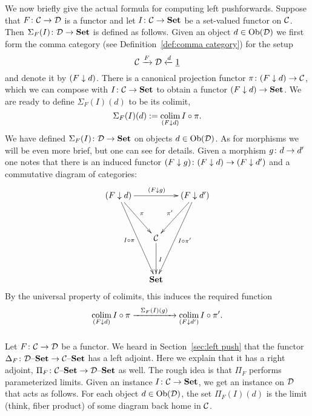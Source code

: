 \documentclass[CT4S-EN-RU]{subfiles}
\begin{document}
\begin{exerciseRUS}
\end{exerciseRUS}

\begin{blockENG}
We now briefly give the actual formula for computing left pushforwards. Suppose that $F\colon\mathcal{C}\rightarrow\mathcal{D}$ is a functor and let $I\colon\mathcal{C}\rightarrow{\mathbf{Set}}$ be a set-valued functor on $\mathcal{C}$. Then $\Sigma_F(I)\colon\mathcal{D}\rightarrow{\mathbf{Set}}$ is defined as follows. Given an object $d\in\textnormal{Ob}(\mathcal{D})$ we first form the comma category (see Definition~\ref{def:comma category}) for the setup
$$\mathcal{C}\xrightarrow{F}\mathcal{D}\xleftarrow{d}\underline{1}$$
and denote it by $(F\downarrow d)$. There is a canonical projection functor $\pi\colon(F\downarrow d)\rightarrow\mathcal{C}$, which we can compose with $I\colon\mathcal{C}\rightarrow{\mathbf{Set}}$ to obtain a functor $(F\downarrow d)\rightarrow{\mathbf{Set}}$. We are ready to define $\Sigma_F(I)(d)$ to be its colimit,
$$\Sigma_F(I)(d):=\mathop{\textnormal{colim}}_{(F\downarrow d)}I\circ\pi.$$
We have defined $\Sigma_F(I)\colon\mathcal{D}\rightarrow{\mathbf{Set}}$ on objects $d\in\textnormal{Ob}(\mathcal{D})$. As for morphisms we will be even more brief, but one can see \cite{Sp1} for details. Given a morphism $g\colon d\rightarrow d'$ one notes that there is an induced functor $(F\downarrow g)\colon (F\downarrow d)\rightarrow(F\downarrow d')$ and a commutative diagram of categories:
$$
\xymatrix@=15pt{
(F\down d)\ar[rr]^{(F\down g)}\ar[ddr]^{\pi}\ar[ddddr]_{I\circ\pi}&&(F\down d')\ar[ddl]_{\pi'}\ar[ddddl]^{I\circ\pi'}\\\\
&\mcC\ar[dd]^I\\\\
&\Set
}
$$
By the universal property of colimits, this induces the required function $$\mathop{\textnormal{colim}}_{(F\downarrow d)}I\circ\pi\xrightarrow{\ \ \Sigma_F(I)(g)\ \ }\mathop{\textnormal{colim}}_{(F\downarrow d')}I\circ\pi'.$$
\end{blockENG}

\begin{blockRUS}
\end{blockRUS}


\subsubsection{}

\begin{blockENG}
Let $F\colon\mathcal{C}\rightarrow\mathcal{D}$ be a functor. We heard in Section~\ref{sec:left push} that the functor $\Delta_F\colon\mathcal{D}{\text \textendash}{\mathbf{Set}}\rightarrow\mathcal{C}{\text \textendash}{\mathbf{Set}}$ has a left adjoint. Here we explain that it has a right adjoint, $\Pi_F\colon\mathcal{C}{\text \textendash}{\mathbf{Set}}\rightarrow\mathcal{D}{\text \textendash}{\mathbf{Set}}$ as well. The rough idea is that $\Pi_F$ performs parameterized limits. Given an instance $I\colon\mathcal{C}\rightarrow{\mathbf{Set}}$, we get an instance on $\mathcal{D}$ that acts as follows. For each object $d\in\textnormal{Ob}(\mathcal{D})$, the set $\Pi_F(I)(d)$ is the limit (think, fiber product) of some diagram back home in $\mathcal{C}$. 
\end{blockENG}
\end{document}
